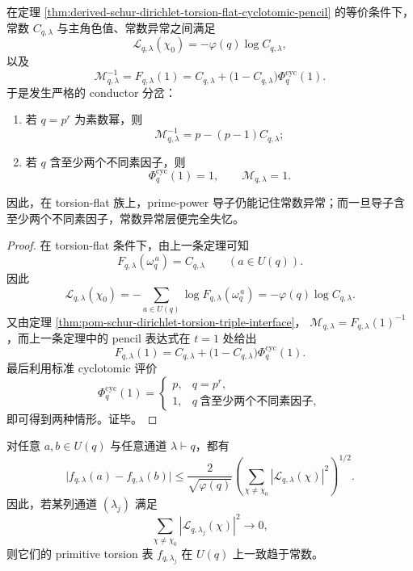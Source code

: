\begin{corollary}\label{cor:derived-schur-dirichlet-primepower-memory-split}
在定理 \ref{thm:derived-schur-dirichlet-torsion-flat-cyclotomic-pencil} 的等价条件下，常数 \(C_{q,\lambda}\) 与主角色值、常数异常之间满足
\[
\mathcal L_{q,\lambda}(\chi_0)
=
-\varphi(q)\log C_{q,\lambda},
\]
以及
\[
\mathcal M_{q,\lambda}^{-1}
=
F_{q,\lambda}(1)
=
C_{q,\lambda}+\bigl(1-C_{q,\lambda}\bigr)\Phi_q^{\mathrm{cyc}}(1).
\]
于是发生严格的 conductor 分岔：
\begin{enumerate}
\normalfont
  \item 若 \(q=p^r\) 为素数幂，则
  \[
  \mathcal M_{q,\lambda}^{-1}
  =
  p-(p-1)C_{q,\lambda};
  \]
  \item 若 \(q\) 含至少两个不同素因子，则
  \[
  \Phi_q^{\mathrm{cyc}}(1)=1,
  \qquad
  \mathcal M_{q,\lambda}=1.
  \]
\end{enumerate}
因此，在 torsion-flat 族上，prime-power 导子仍能记住常数异常；而一旦导子含至少两个不同素因子，常数异常层便完全失忆。
\end{corollary}

\begin{proof}
在 torsion-flat 条件下，由上一条定理可知
\[
F_{q,\lambda}(\omega_q^{\,a})=C_{q,\lambda}
\qquad (a\in U(q)).
\]
因此
\[
\mathcal L_{q,\lambda}(\chi_0)
=
-\sum_{a\in U(q)}\log F_{q,\lambda}(\omega_q^{\,a})
=
-\varphi(q)\log C_{q,\lambda}.
\]
又由定理 \ref{thm:pom-schur-dirichlet-torsion-triple-interface}，
\(
\mathcal M_{q,\lambda}=F_{q,\lambda}(1)^{-1}
\)，而上一条定理中的 pencil 表达式在 \(t=1\) 处给出
\[
F_{q,\lambda}(1)
=
C_{q,\lambda}+\bigl(1-C_{q,\lambda}\bigr)\Phi_q^{\mathrm{cyc}}(1).
\]
最后利用标准 cyclotomic 评价
\[
\Phi_q^{\mathrm{cyc}}(1)=
\begin{cases}
p,& q=p^r,\\
1,& q\ \text{含至少两个不同素因子},
\end{cases}
\]
即可得到两种情形。证毕。
\end{proof}

\begin{proposition}\label{prop:derived-schur-dirichlet-uniform-flatness-bound}
对任意 \(a,b\in U(q)\) 与任意通道 \(\lambda\vdash q\)，都有
\[
\bigl|f_{q,\lambda}(a)-f_{q,\lambda}(b)\bigr|
\le
\frac{2}{\sqrt{\varphi(q)}}
\left(\sum_{\chi\neq\chi_0}|\mathcal L_{q,\lambda}(\chi)|^2\right)^{1/2}.
\]
因此，若某列通道 \((\lambda_j)\) 满足
\[
\sum_{\chi\neq\chi_0}|\mathcal L_{q,\lambda_j}(\chi)|^2\longrightarrow 0,
\]
则它们的 primitive torsion 表 \(f_{q,\lambda_j}\) 在 \(U(q)\) 上一致趋于常数。
\end{proposition}


